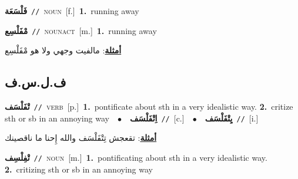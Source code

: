 \documentclass[10pt,a4paper,twoside]{article} %
\begin{document}
\begin{multicols}{2}
{\setlength\topsep{0pt}\textbf{\foreignlanguage{arabic}{فَلْسَعَة}}\ {\color{gray}\texttt{//}\color{black}}\ \textsc{noun}\ [f.]\ \textbf{1.}~running away\ } \vspace{2mm}

{\setlength\topsep{0pt}\textbf{\foreignlanguage{arabic}{مْفَلْسِع}}\ {\color{gray}\texttt{//}\color{black}}\ \textsc{noun\textunderscore act}\ [m.]\ \textbf{1.}~running away\  \begin{flushright}\color{gray}\foreignlanguage{arabic}{\textbf{\underline{\foreignlanguage{arabic}{أمثلة}}}: مالفيت وجهي ولا هو مْفَلْسِع}\end{flushright}\color{black}} \vspace{2mm}

\vspace{-3mm}
\subsection*{\color{blue}\foreignlanguage{arabic}{ف.ل.س.ف}\color{blue}{}} 

{\setlength\topsep{0pt}\textbf{\foreignlanguage{arabic}{تْفَلْسَف}}\ {\color{gray}\texttt{//}\color{black}}\ \textsc{verb}\ [p.]\ \textbf{1.}~pontificate about sth in a very idealistic way.  \textbf{2.}~critize sth or sb in an annoying way\ \ $\bullet$\ \ \setlength\topsep{0pt}\textbf{\foreignlanguage{arabic}{اِتْفَلْسَف}}\ {\color{gray}\texttt{//}\color{black}}\ [c.]\ \ $\bullet$\ \ \setlength\topsep{0pt}\textbf{\foreignlanguage{arabic}{يِتْفَلْسَف}}\ {\color{gray}\texttt{//}\color{black}}\ [i.]\  \begin{flushright}\color{gray}\foreignlanguage{arabic}{\textbf{\underline{\foreignlanguage{arabic}{أمثلة}}}: تقعجش تِتْفَلْسَف والله إِحنا ما ناقصينك}\end{flushright}\color{black}} \vspace{2mm}

{\setlength\topsep{0pt}\textbf{\foreignlanguage{arabic}{تْفِلْسِف}}\ {\color{gray}\texttt{//}\color{black}}\ \textsc{noun}\ [m.]\ \textbf{1.}~pontificating about sth in a very idealistic way.  \textbf{2.}~critizing sth or sb in an annoying way\ } \vspace{2mm}


\end{multicols}
\end{document}
